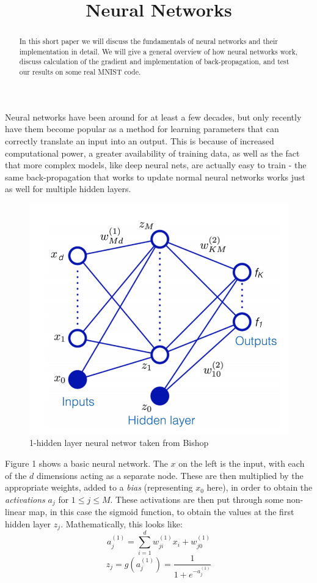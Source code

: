 \documentclass[10pt,letterpaper]{article}
\title{\vspace{-4ex}Neural Networks\vspace{-3.5ex}}
\begin{document}
\maketitle
\vspace{-0.5em}
\begin{abstract}
In this short paper we will discuss the fundamentals of neural networks and their implementation in detail. We will give a general overview of how neural networks work, discuss calculation of the gradient and implementation of back-propagation, and test our results on some real MNIST code.
\end{abstract}
Neural networks have been around for at least a few decades, but only recently have them become popular as a method for learning parameters that can correctly translate an input into an output. This is because of increased computational power, a greater availability of training data, as well as the fact that more complex models, like deep neural nets, are actually easy to train - the same back-propagation that works to update normal neural networks works just as well for multiple hidden layers.
\begin{figure}[!htb]
\centering
{}
  \includegraphics[width=\linewidth]{figures/neural.png}
  \caption{1-hidden layer neural networ taken from Bishop}\label{fig:neural}
\endminipage\hfill
\end{figure}
Figure 1 shows a basic neural network. The $x$ on the left is the input, with each of the $d$ dimensions acting as a separate node. These are then multiplied by the appropriate weights, added to a \textit{bias} (representing $x_0$ here), in order to obtain the \textit{activations} $a_j$ for $1\le j\le M$. These activations are then put through some non-linear map, in this case the sigmoid function, to obtain the values at the first hidden layer $z_j$. Mathematically, this looks like:
$$a_j^{(1)} = \sum_{i=1}^d w_{ji}^{(1)}x_i+w_{j0}^{(1)}$$
$$z_j = g(a_j^{(1)}) = \frac{1}{1 + e^{-a_j^{(1)}}}$$
\end{document}
